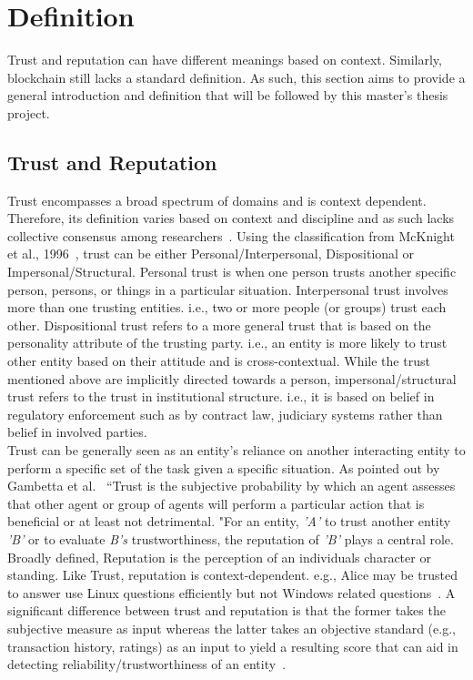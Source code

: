 \section{Definition}
Trust and reputation can have different meanings based on context. Similarly,
blockchain still lacks a standard definition. As such, this section aims to
provide a general introduction and definition that will be followed by this
master's thesis project. 

\subsection{Trust and Reputation}
Trust encompasses a broad spectrum of domains and is context dependent.
Therefore, its definition varies based on context and discipline and as such
lacks collective consensus among researchers~\cite{mcknight1996meanings}.
Using the classification from McKnight et al., 1996~\cite{mcknight2001trust},
trust can be either Personal/Interpersonal, Dispositional or
Impersonal/Structural.  Personal trust is when one person trusts another
specific person, persons, or things in a particular situation. Interpersonal
trust involves more than one trusting entities. i.e., two or more people (or
groups) trust each other.  Dispositional trust refers to a more general trust
that is based on the personality attribute of the trusting party. i.e., an
entity is more likely to trust other entity based on their attitude and is
cross-contextual. While the trust mentioned above are implicitly directed
towards a person, impersonal/structural trust refers to the trust in
institutional structure.  i.e., it is based on belief in regulatory enforcement
such as by contract law, judiciary systems rather than belief in involved
parties.\\

Trust can be generally seen as an entity's reliance on another interacting
entity to perform a specific set of the task given a specific situation.  As
pointed out by Gambetta et al.~\cite{gambetta2000can} ``Trust is the subjective
probability by which an agent assesses that other agent or group of agents will
perform a particular action that is beneficial or at least not detrimental.
"For an entity, \textit{'A'} to trust another entity \textit{'B'} or to
evaluate \textit{B's} trustworthiness, the reputation of \textit{'B'} plays a
central role. Broadly defined, Reputation is the perception of an individuals
character or standing. Like Trust, reputation is context-dependent.  e.g.,
Alice may be trusted to answer use Linux questions efficiently but not Windows
related questions~\cite{zacharia2000collaborative}. A significant difference
between trust and reputation is that the former takes the subjective measure as
input whereas the latter takes an objective standard (e.g., transaction
history, ratings) as an input to yield a resulting score that can aid in
detecting reliability/trustworthiness of an
entity~\cite{Sabater2005,castelfranchi2000trust}. \\

